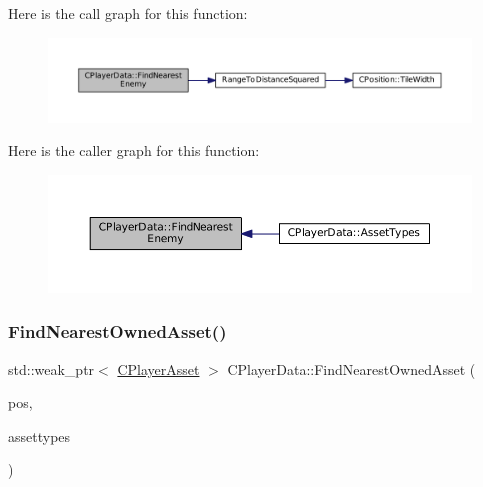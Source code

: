 Here is the call graph for this function\+:\nopagebreak
\begin{figure}[H]
\begin{center}
\leavevmode
\includegraphics[width=350pt]{classCPlayerData_a5f0a1280933f7bb9a65ab256ecff1a69_cgraph}
\end{center}
\end{figure}
Here is the caller graph for this function\+:\nopagebreak
\begin{figure}[H]
\begin{center}
\leavevmode
\includegraphics[width=350pt]{classCPlayerData_a5f0a1280933f7bb9a65ab256ecff1a69_icgraph}
\end{center}
\end{figure}
\hypertarget{classCPlayerData_a53c9e046c6f43fd83a0feb32b4fe999d}{}\label{classCPlayerData_a53c9e046c6f43fd83a0feb32b4fe999d} 
\subsubsection{\texorpdfstring{Find\+Nearest\+Owned\+Asset()}{FindNearestOwnedAsset()}}
{\footnotesize\ttfamily std\+::weak\+\_\+ptr$<$ \hyperlink{classCPlayerAsset}{C\+Player\+Asset} $>$ C\+Player\+Data\+::\+Find\+Nearest\+Owned\+Asset (\begin{DoxyParamCaption}\item[{const \hyperlink{classCPosition}{C\+Position} \&}]{pos,  }\item[{const std\+::vector$<$ \hyperlink{GameDataTypes_8h_a5600d4fc433b83300308921974477fec}{E\+Asset\+Type} $>$}]{assettypes }\end{DoxyParamCaption})}



